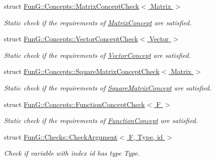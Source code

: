 \begin{DoxyCompactItemize}
struct \hyperlink{structFunG_1_1Concepts_1_1MatrixConceptCheck}{Fun\+G\+::\+Concepts\+::\+Matrix\+Concept\+Check$<$ Matrix $>$}
\begin{DoxyCompactList}\small\item\em Static check if the requirements of \hyperlink{structFunG_1_1Concepts_1_1MatrixConcept}{Matrix\+Concept} are satisfied. \end{DoxyCompactList}\item 
struct \hyperlink{structFunG_1_1Concepts_1_1VectorConceptCheck}{Fun\+G\+::\+Concepts\+::\+Vector\+Concept\+Check$<$ Vector $>$}
\begin{DoxyCompactList}\small\item\em Static check if the requirements of \hyperlink{structFunG_1_1Concepts_1_1VectorConcept}{Vector\+Concept} are satisfied. \end{DoxyCompactList}\item 
struct \hyperlink{structFunG_1_1Concepts_1_1SquareMatrixConceptCheck}{Fun\+G\+::\+Concepts\+::\+Square\+Matrix\+Concept\+Check$<$ Matrix $>$}
\begin{DoxyCompactList}\small\item\em Static check if the requirements of \hyperlink{structFunG_1_1Concepts_1_1SquareMatrixConcept}{Square\+Matrix\+Concept} are satisfied. \end{DoxyCompactList}\item 
struct \hyperlink{structFunG_1_1Concepts_1_1FunctionConceptCheck}{Fun\+G\+::\+Concepts\+::\+Function\+Concept\+Check$<$ F $>$}
\begin{DoxyCompactList}\small\item\em Static check if the requirements of \hyperlink{structFunG_1_1Concepts_1_1FunctionConcept}{Function\+Concept} are satisfied. \end{DoxyCompactList}\item 
struct \hyperlink{structFunG_1_1Checks_1_1CheckArgument}{Fun\+G\+::\+Checks\+::\+Check\+Argument$<$ F, Type, id $>$}
\begin{DoxyCompactList}\small\item\em Check if variable with index id has type Type. \end{DoxyCompactList}\end{DoxyCompactItemize}
